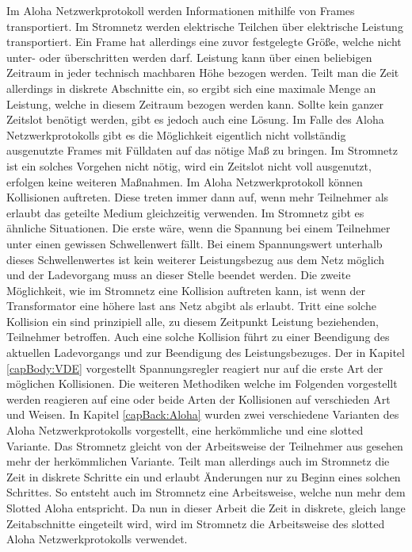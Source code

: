 Im Aloha Netzwerkprotokoll werden Informationen mithilfe von Frames transportiert. Im Stromnetz werden elektrische Teilchen über elektrische Leistung transportiert. Ein Frame hat allerdings eine zuvor festgelegte Größe, welche nicht unter- oder überschritten werden darf. Leistung kann über einen beliebigen Zeitraum in jeder technisch machbaren Höhe bezogen werden. Teilt man die Zeit allerdings in diskrete Abschnitte ein, so ergibt sich eine maximale Menge an Leistung, welche in diesem Zeitraum bezogen werden kann. Sollte kein ganzer Zeitslot benötigt werden, gibt es jedoch auch eine Lösung. Im Falle des Aloha Netzwerkprotokolls gibt es die Möglichkeit eigentlich nicht vollständig ausgenutzte Frames mit Fülldaten auf das nötige Maß zu bringen. Im Stromnetz ist ein solches Vorgehen nicht nötig, wird ein Zeitslot nicht voll ausgenutzt, erfolgen keine weiteren Maßnahmen. Im Aloha Netzwerkprotokoll können Kollisionen auftreten. Diese treten immer dann auf, wenn mehr Teilnehmer als erlaubt das geteilte Medium gleichzeitig verwenden. Im Stromnetz gibt es ähnliche Situationen. Die erste wäre, wenn die Spannung bei einem Teilnehmer unter einen gewissen Schwellenwert fällt. Bei einem Spannungswert unterhalb dieses Schwellenwertes ist kein weiterer Leistungsbezug aus dem Netz möglich und der Ladevorgang muss an dieser Stelle beendet werden. Die zweite Möglichkeit, wie im Stromnetz eine Kollision auftreten kann, ist wenn der Transformator eine höhere last ans Netz abgibt als erlaubt. Tritt eine solche Kollision ein sind prinzipiell alle, zu diesem Zeitpunkt Leistung beziehenden, Teilnehmer betroffen. Auch eine solche Kollision führt zu einer Beendigung des aktuellen Ladevorgangs und zur Beendigung des Leistungsbezuges. Der in Kapitel \ref{capBody:VDE} vorgestellt Spannungsregler reagiert nur auf die erste Art der möglichen Kollisionen. Die weiteren Methodiken welche im Folgenden vorgestellt werden reagieren auf eine oder beide Arten der Kollisionen auf verschieden Art und Weisen.
In Kapitel \ref{capBack:Aloha} wurden zwei verschiedene Varianten des Aloha Netzwerkprotokolls vorgestellt, eine herkömmliche und eine slotted Variante. Das Stromnetz gleicht von der Arbeitsweise der Teilnehmer aus gesehen mehr der herkömmlichen Variante. Teilt man allerdings auch im Stromnetz die Zeit in diskrete Schritte ein und erlaubt Änderungen nur zu Beginn eines solchen Schrittes. So entsteht auch im Stromnetz eine Arbeitsweise, welche nun mehr dem Slotted Aloha entspricht. Da nun in dieser Arbeit die Zeit in diskrete, gleich lange Zeitabschnitte eingeteilt wird, wird im Stromnetz die Arbeitsweise des slotted Aloha Netzwerkprotokolls verwendet.

